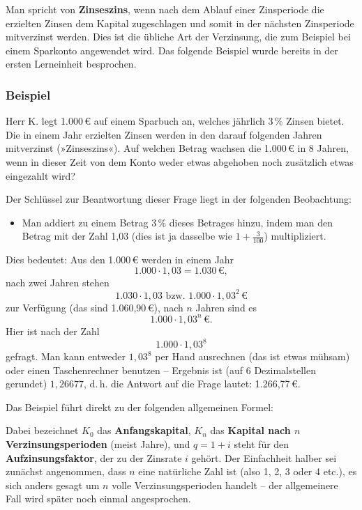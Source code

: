 Man spricht von \textbf{Zinseszins}, wenn nach dem Ablauf einer Zinsperiode die erzielten Zinsen dem Kapital zugeschlagen und somit in der nächsten Zinsperiode mitverzinst werden. Dies ist die übliche Art der Verzinsung, die zum Beispiel bei einem Sparkonto angewendet wird. Das folgende Beispiel wurde bereits in der ersten Lerneinheit besprochen.

\subsubsection{Beispiel}

Herr K. legt 1.000\,€ auf einem Sparbuch an, welches jährlich 3\,\% Zinsen bietet. Die in einem Jahr erzielten Zinsen werden in den darauf folgenden Jahren mitverzinst (»Zinseszins«). Auf welchen Betrag wachsen die 1.000\,€ in 8 Jahren, wenn in dieser Zeit von dem Konto weder etwas abgehoben noch zusätzlich etwas eingezahlt wird?

Der Schlüssel zur Beantwortung dieser Frage liegt in der folgenden Beobachtung:
\begin{itemize}
  \item Man addiert zu einem Betrag 3\,\% dieses Betrages hinzu, indem man den Betrag mit der Zahl 1{,}03 (dies ist ja dasselbe wie $1 + \tfrac{3}{100}$) multipliziert.
\end{itemize}

Dies bedeutet: Aus den 1.000\,€ werden in einem Jahr
\[ 1.000 \cdot 1{,}03 = 1.030\,€ , \]
nach zwei Jahren stehen
\[ 1.030 \cdot 1{,}03 \text{ bzw. } 1.000 \cdot 1{,}03^2\,€ \]
zur Verfügung (das sind 1.060{,}90\,€), nach $n$ Jahren sind es
\[ 1.000 \cdot 1{,}03^n\,€ . \]
Hier ist nach der Zahl
\[ 1.000 \cdot 1{,}03^8 \]
gefragt. Man kann entweder $1{,}03^8$ per Hand ausrechnen (das ist etwas mühsam) oder einen Taschenrechner benutzen -- Ergebnis ist (auf 6 Dezimalstellen gerundet) $1{,}26677$, d.\,h. die Antwort auf die Frage lautet: 1.266{,}77\,€.\beispielende

Das Beispiel führt direkt zu der folgenden allgemeinen Formel:
\merkbox{\[ K_n = K_0 \cdot q^n \]}

Dabei bezeichnet $K_0$ das \textbf{Anfangskapital}, $K_n$ das \textbf{Kapital nach $n$ Verzinsungsperioden} (meist Jahre), und $q = 1 + i$ steht für den \textbf{Aufzinsungsfaktor}, der zu der Zinsrate $i$ gehört. Der Einfachheit halber sei zunächst angenommen, dass $n$ eine natürliche Zahl ist (also 1, 2, 3 oder 4 etc.), es sich anders gesagt um $n$ volle Verzinsungsperioden handelt -- der allgemeinere Fall wird später noch einmal angesprochen.

